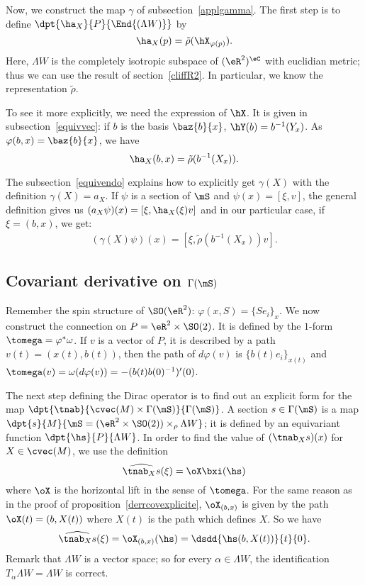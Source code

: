Now, we construct the map $\gamma$ of subsection~\ref{applgamma}. The first step is to define $\dpt{\ha_X}{P}{\End{(\Lambda W )}}$ by
\[
	\ha_X(p)=\tilde\rho(\hX_{\varphi(p)}).
\]
Here, $\Lambda W $ is the completely isotropic subspace of $(\eR^2)^{\eC}$ with euclidian metric; thus we can use the result of section~\ref{cliffR2}. In particular, we know the representation $\tilde\rho$.

To see it more explicitly, we need the expression of $\hX$. It is given in subsection~\ref{equivvec}: if $b$ is the basis $\baz{b}{x}$, $\hY(b)=b^{-1}(Y_x)$. As $\varphi(b,x)=\baz{b}{x}$, we have
\[
	\ha_X(b,x)=\tilde\rho(b^{-1}(X_x)).
\]

The subsection~\ref{equivendo} explains how to explicitly get $\gamma(X)$ with the definition $\gamma(X)=a_X$. If $\psi$ is a section of $\mS$ and $\psi(x)=[\xi,v]$, the general definition gives us $(a_X\psi)(x)=[\xi,\ha_X(\xi)v]$ and in our particular case, if $\xi=(b,x)$, we get:
\begin{eqnarray}
	\label{gammaX}(\gamma(X)\psi)(x)=[\xi,\tilde\rho(b^{-1}(X_x))v].
\end{eqnarray}

\subsection{Covariant derivative on \texorpdfstring{$\protect\Gamma(\mS)$}{S}}

Remember the spin structure of $\SO(\eR^2)$: $\varphi(x,S)=\{Se_i\}_x$. We now construct the connection on $P=\eR^2\times \SO(2)$. It is defined by the $1$-form $\tomega=\varphi^*\omega$. If $v$ is a vector of $P$, it is described by a path $v(t)=(x(t),b(t))$, then the path of $d\varphi(v)$ is $\{b(t)e_i\}_{x(t)}$ and $\tomega(v)=\omega(d\varphi(v))=-(b(t)b(0)^{-1})'(0)$.

The next step defining the Dirac operator is to find out an explicit form for the map $\dpt{\tnab}{\cvec(M)\times\Gamma(\mS)}{\Gamma(\mS)}$. A section $s\in\Gamma(\mS)$ is a map $\dpt{s}{M}{\mS=(\eR^2\times \SO(2))\times_{\rho}\Lambda W }$; it is defined by an equivariant function $\dpt{\hs}{P}{\Lambda W }$. In order to find the value of $(\tnab_Xs)(x)$ for $X\in\cvec(M)$, we use the definition
\[
	\widehat{\tnab_Xs}(\xi)=\oX\bxi(\hs)
\]
where $\oX$ is the horizontal lift in the sense of $\tomega$. For the same reason as in the proof of proposition~\ref{derrcovexplicite}, $\oX_{(b,x)}$ is given by the path $\oX(t)=(b,X(t))$ where $X(t)$ is the path which defines $X$. So we have
\[
	\widehat{\tnab_Xs}(\xi)=\oX_{(b,x)}(\hs)=\dsdd{\hs(b,X(t))}{t}{0}.
\]
Remark that $\Lambda W $ is a vector space; so for every $\alpha\in\Lambda W $, the identification $T_{\alpha}\Lambda W =\Lambda W $ is correct.

